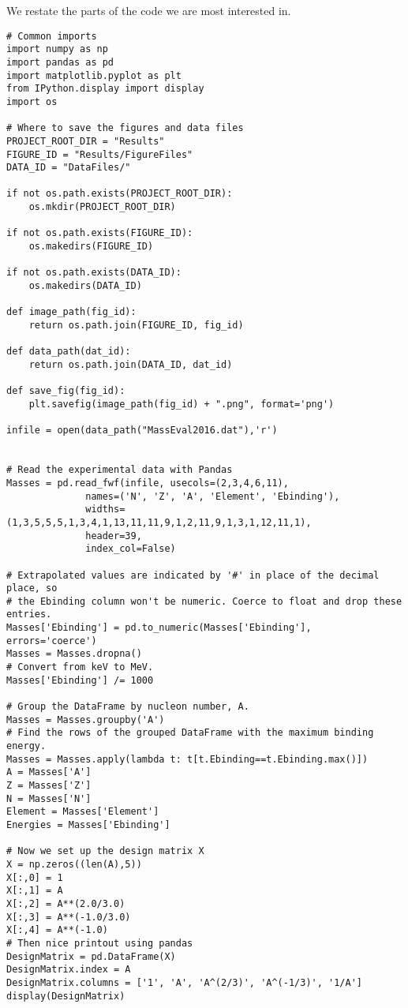 \documentclass[%
oneside,                 %
final,                   %
10pt]{article}
\begin{document}
We restate the parts of the code we are most interested in.
\begin{verbatim}
# Common imports
import numpy as np
import pandas as pd
import matplotlib.pyplot as plt
from IPython.display import display
import os

# Where to save the figures and data files
PROJECT_ROOT_DIR = "Results"
FIGURE_ID = "Results/FigureFiles"
DATA_ID = "DataFiles/"

if not os.path.exists(PROJECT_ROOT_DIR):
    os.mkdir(PROJECT_ROOT_DIR)

if not os.path.exists(FIGURE_ID):
    os.makedirs(FIGURE_ID)

if not os.path.exists(DATA_ID):
    os.makedirs(DATA_ID)

def image_path(fig_id):
    return os.path.join(FIGURE_ID, fig_id)

def data_path(dat_id):
    return os.path.join(DATA_ID, dat_id)

def save_fig(fig_id):
    plt.savefig(image_path(fig_id) + ".png", format='png')

infile = open(data_path("MassEval2016.dat"),'r')


# Read the experimental data with Pandas
Masses = pd.read_fwf(infile, usecols=(2,3,4,6,11),
              names=('N', 'Z', 'A', 'Element', 'Ebinding'),
              widths=(1,3,5,5,5,1,3,4,1,13,11,11,9,1,2,11,9,1,3,1,12,11,1),
              header=39,
              index_col=False)

# Extrapolated values are indicated by '#' in place of the decimal place, so
# the Ebinding column won't be numeric. Coerce to float and drop these entries.
Masses['Ebinding'] = pd.to_numeric(Masses['Ebinding'], errors='coerce')
Masses = Masses.dropna()
# Convert from keV to MeV.
Masses['Ebinding'] /= 1000

# Group the DataFrame by nucleon number, A.
Masses = Masses.groupby('A')
# Find the rows of the grouped DataFrame with the maximum binding energy.
Masses = Masses.apply(lambda t: t[t.Ebinding==t.Ebinding.max()])
A = Masses['A']
Z = Masses['Z']
N = Masses['N']
Element = Masses['Element']
Energies = Masses['Ebinding']

# Now we set up the design matrix X
X = np.zeros((len(A),5))
X[:,0] = 1
X[:,1] = A
X[:,2] = A**(2.0/3.0)
X[:,3] = A**(-1.0/3.0)
X[:,4] = A**(-1.0)
# Then nice printout using pandas
DesignMatrix = pd.DataFrame(X)
DesignMatrix.index = A
DesignMatrix.columns = ['1', 'A', 'A^(2/3)', 'A^(-1/3)', '1/A']
display(DesignMatrix)
\end{verbatim}
\end{document}

